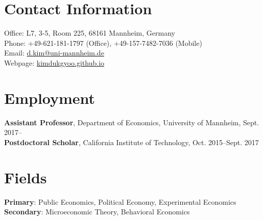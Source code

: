 \documentclass[margin]{res}
\begin{document}
 

\begin{resume} 
\section{Contact Information} Office: L7, 3-5, Room 225, 68161 Mannheim, Germany\\
Phone: +49-621-181-1797 (Office), +49-157-7482-7036 (Mobile)\\
Email: \href{mailto:d.kim@uni-mannheim.de}{d.kim@uni-mannheim.de}\\
Webpage: \url{kimdukgyoo.github.io}

\section{Employment}
\textbf{Assistant Professor}, Department of Economics, University of Mannheim, Sept. 2017--\\
\textbf{Postdoctoral Scholar}, California Institute of Technology, Oct. 2015--Sept. 2017%

\section{Fields}
\textbf{Primary}: Public Economics, Political Economy, Experimental Economics\\
\textbf{Secondary}: Microeconomic Theory, Behavioral Economics


\end{resume}
\end{document}
